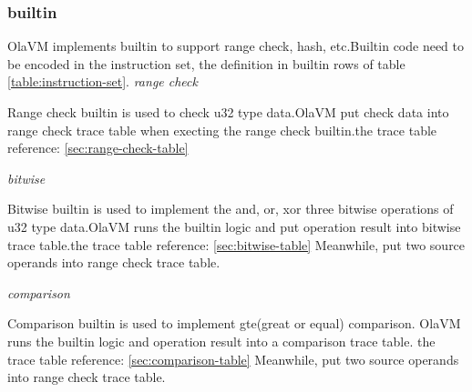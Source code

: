 \subsubsection{builtin}\label{subsec: instructions-builtin}
OlaVM implements builtin to support range check, hash, etc.Builtin code need to be encoded in the instruction set, the definition in builtin rows of table \ref{table:instruction-set}.
\emph{range check}

Range check builtin is used to check u32 type data.OlaVM put check data into range check trace table when execting the range check builtin.the trace table reference: \ref{sec:range-check-table}

\emph{bitwise}

Bitwise builtin is used to implement the and, or, xor three bitwise operations of u32 type data.OlaVM runs the builtin logic and put operation result into bitwise trace table.the trace table reference: \ref{sec:bitwise-table}
Meanwhile, put two source operands into range check trace table.

\emph{comparison}

Comparison builtin is used to implement gte(great or equal) comparison. OlaVM runs the builtin logic and operation result into a comparison trace table. the trace table reference: \ref{sec:comparison-table}
Meanwhile, put two source operands into range check trace table.
